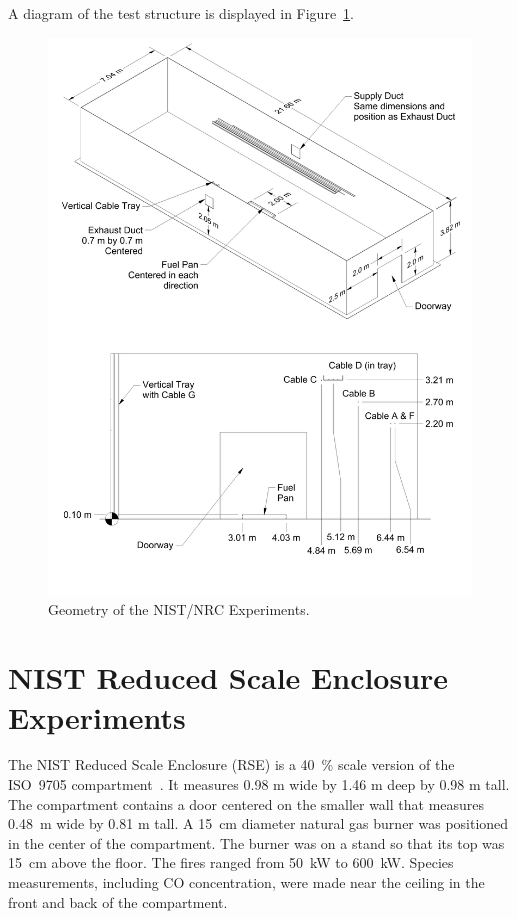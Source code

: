 A diagram of the test structure is displayed in Figure~\ref{NIST_NRC_Drawing}.

\begin{figure}
\begin{center}
\includegraphics[height=6.in]{FIGURES/NIST_NRC/NIST_NRC_Drawing}
\end{center}
\caption[Geometry of the NIST/NRC Experiments]{Geometry of the NIST/NRC Experiments.}
\label{NIST_NRC_Drawing}
\end{figure}




\clearpage



\section{NIST Reduced Scale Enclosure Experiments}

The NIST Reduced Scale Enclosure (RSE) is a 40~\% scale version of the ISO~9705 compartment~\cite{Bryner:1}.
It measures 0.98 m wide by 1.46 m deep by 0.98 m tall.  The compartment contains a door centered on the smaller
wall that measures 0.48~m wide by 0.81 m tall.  A 15~cm diameter natural gas burner was positioned in the
center of the compartment.  The burner was on a stand so that its top was 15~cm above the floor.
The fires ranged from 50~kW to 600~kW.
Species measurements, including CO concentration, were made near the ceiling in the front and back of the compartment.

